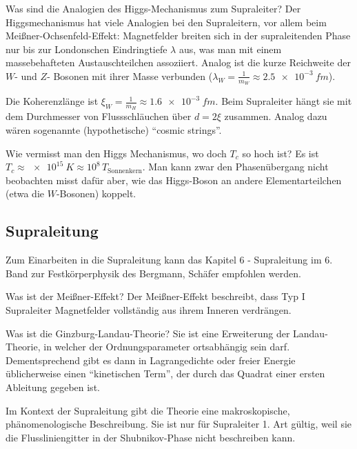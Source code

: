 \begin{fquestion}{Was sind die Analogien des Higgs-Mechanismus zum Supraleiter?}
    Der Higgsmechanismus hat viele Analogien bei den Supraleitern, vor allem beim Meißner-Ochsenfeld-Effekt: Magnetfelder breiten sich in der supraleitenden Phase nur bis zur Londonschen Eindringtiefe $\lambda$ aus, was man mit einem massebehafteten Austauschteilchen assoziiert.
    Analog ist die kurze Reichweite der $W$- und $Z$- Bosonen mit ihrer Masse verbunden ($\lambda_W = \frac{1}{m_W} \approx \SI{2.5e-3}{fm}$).
    
    Die Koherenzlänge ist $\xi_W = \frac{1}{m_H} \approx \SI{1.6e-3}{fm}$.
    Beim Supraleiter hängt sie mit dem Durchmesser von Flussschläuchen über $d=2\xi$ zusammen.
    Analog dazu wären sogenannte (hypothetische) ``cosmic strings''.
\end{fquestion}

\begin{fquestion}{Wie vermisst man den Higgs Mechanismus, wo doch $T_c$ so hoch ist?}
    Es ist $T_c \approx \SI{e15}{K} \approx 10^8\, T_{\mathrm{Sonnenkern}}$. 
    Man kann zwar den Phasenübergang nicht beobachten misst dafür aber, wie das Higgs-Boson an andere Elementarteilchen (etwa die $W$-Bosonen) koppelt.
\end{fquestion}

\subsection{Supraleitung}

Zum Einarbeiten in die Supraleitung kann das Kapitel 6 - Supraleitung im 6. Band zur Festkörperphysik des Bergmann, Schäfer empfohlen werden.

\begin{fquestion}{Was ist der Meißner-Effekt?}
    Der Meißner-Effekt beschreibt, dass Typ I Supraleiter Magnetfelder vollständig aus ihrem Inneren verdrängen. 
\end{fquestion}

\begin{fquestion}{Was ist die Ginzburg-Landau-Theorie?}
    Sie ist eine Erweiterung der Landau-Theorie, in welcher der Ordnungsparameter ortsabhängig sein darf.
    Dementsprechend gibt es dann in Lagrangedichte oder freier Energie üblicherweise einen ``kinetischen Term'', der durch das Quadrat einer ersten Ableitung gegeben ist.
    
    Im Kontext der Supraleitung gibt die Theorie eine makroskopische, phänomenologische Beschreibung. 
    Sie ist nur für Supraleiter 1. Art gültig, weil sie die Flussliniengitter in der Shubnikov-Phase nicht beschreiben kann.
\end{fquestion}

